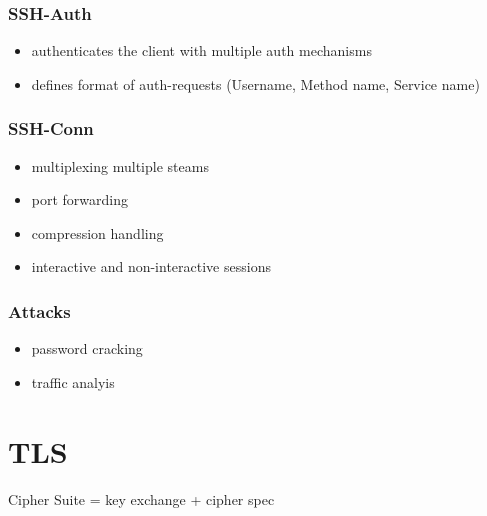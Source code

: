 \documentclass[fs, footer]{latex4ei}
\begin{document}
\begin{multicols*}{4}
{\subsubsection{SSH-Auth}
\begin{itemize}
 	\item authenticates the client with multiple auth mechanisms
 	\item defines format of auth-requests (Username, Method name, Service name)
 \end{itemize}

 \subsubsection{SSH-Conn}
 \begin{itemize}
 	\item multiplexing multiple steams
 	\item port forwarding
 	\item compression handling
 	\item interactive and non-interactive sessions
 \end{itemize}


\subsubsection{Attacks}
\begin{itemize}
	\item password cracking
	\item traffic analyis
\end{itemize}
}

\section{TLS}
Cipher Suite = key exchange + cipher spec

 \sectionbox{
}
\end{multicols*}
\end{document}

